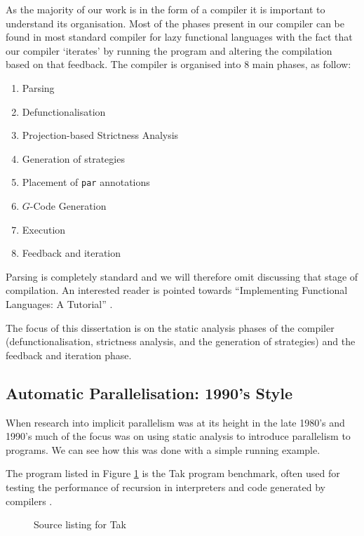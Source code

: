 As the majority of our work is in the form of a compiler it is important to
understand its organisation. Most of the phases present in our compiler can be
found in most standard compiler for lazy functional languages with the fact
that our compiler `iterates' by running the program and altering the
compilation based on that feedback. The compiler is organised into 8 main
phases, as follow:

\begin{enumerate}
    \item Parsing
    \item Defunctionalisation
    \item Projection-based Strictness Analysis
    \item Generation of strategies
    \item Placement of \verb-par- annotations
    \item $G$-Code Generation
    \item Execution
    \item Feedback and iteration
\end{enumerate}

Parsing is completely standard and we will therefore omit discussing that stage
of compilation. An interested reader is pointed towards ``Implementing
Functional Languages: A Tutorial'' \cite{PeytonJones:IFL}.

The focus of this dissertation is on the static analysis phases of the compiler
(defunctionalisation, strictness analysis, and the generation of strategies)
and the feedback and iteration phase.

\subsection{Automatic Parallelisation: 1990's Style}

When research into implicit parallelism was at its height in the late 1980's and 1990's
much of the focus was on using static analysis to introduce parallelism to programs.
We can see how this was done with a simple running example.

The program listed in Figure \ref{fig:tak} is the Tak program benchmark, often used
for testing the performance of recursion in interpreters and code generated by
compilers \citep{ExamplesOfRecursion}.

\begin{figure}
  
\caption{Source listing for Tak}
\label{fig:tak}
\end{figure}

